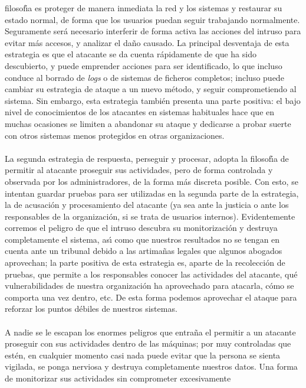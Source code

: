 filosof\'{\i}a es proteger de manera inmediata la red y los sistemas y restaurar
su estado normal, de forma que los usuarios puedan seguir trabajando 
normalmente. Seguramente ser\'a necesario interferir de forma activa las 
acciones del intruso para evitar m\'as accesos, y analizar el da\~no causado. La
principal desventaja de esta estrategia es que el atacante se da cuenta 
r\'apidamente de que ha sido descubierto, y puede emprender acciones para ser
identificado, lo que incluso conduce al borrado de {\it logs} o de sistemas
de ficheros completos; incluso puede cambiar su estrategia de ataque a un 
nuevo m\'etodo, y seguir comprometiendo al sistema. Sin embargo, esta estrategia
tambi\'en presenta una parte positiva: el bajo nivel de conocimientos de los 
atacantes en sistemas habituales hace que en muchas ocasiones se limiten a 
abandonar su ataque y dedicarse a probar suerte con otros sistemas menos 
protegidos en otras organizaciones.\\
\\La segunda estrategia de respuesta, perseguir y procesar, adopta la 
filosof\'{\i}a de permitir al atacante proseguir sus actividades, pero de forma
controlada y observada por los administradores, de la forma m\'as discreta
posible. Con esto, se intentan guardar pruebas para ser utilizadas en la 
segunda parte de la estrategia, la de acusaci\'on y procesamiento del 
atacante (ya sea ante la justicia o ante los responsables de la organizaci\'on,
si se trata de usuarios internos). Evidentemente corremos el peligro de que
el intruso descubra su monitorizaci\'on y destruya completamente el sistema,
as\'{\i} como que nuestros resultados no se tengan en cuenta ante un tribunal
debido a las artima\~nas legales que algunos abogados aprovechan; la parte 
positiva de esta estrategia es, aparte de la recolecci\'on de pruebas, que
permite a los responsables conocer las actividades del atacante, qu\'e
vulnerabilidades de nuestra organizaci\'on ha aprovechado para atacarla, c\'omo
se comporta una vez dentro, etc. De esta forma podemos aprovechar el ataque
para reforzar los puntos d\'ebiles de nuestros sistemas.\\
\\A nadie se le escapan los enormes peligros que entra\~na el permitir a un
atacante proseguir con sus actividades dentro de las m\'aquinas; por muy 
controladas que est\'en, en cualquier momento casi nada puede evitar que la
persona se sienta vigilada, se ponga nerviosa y destruya completamente nuestros
datos. Una forma de monitorizar sus actividades sin comprometer excesivamente
